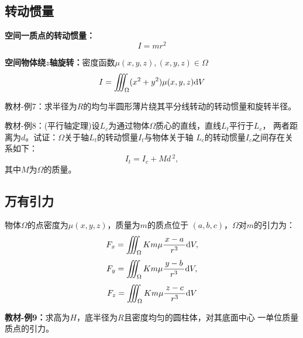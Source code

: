 \subsection{转动惯量}

{\bf 空间一质点的转动惯量：}$${I=mr^2}$$

\begin{center}
\end{center}

{\bf 空间物体绕$z$轴旋转：}密度函数$\mu(x,y,z),(x,y,z)\in\Omega$
$${I=\iiint_{\Omega}(x^2+y^2)\mu(x,y,z)\mathrm{d} V}$$

{教材-例7：}求半径为$R$的均匀半圆形薄片绕其平分线转动的转动惯量和旋转半径。

{教材-例8：}(平行轴定理)设$L_c$为通过物体$\Omega$质心的直线，直线$L_t$平行于$L_c$，
两者距离为$d$。试证：$\Omega$关于轴$L_t$的转动惯量$I_t$与物体关于轴
$L_c$的转动惯量$I_c$之间存在关系如下：
$$I_t=I_c+Md\,^2,$$
其中$M$为$\Omega$的质量。

\subsection{万有引力}

物体$\Omega$的点密度为$\mu(x,y,z)$，质量为$m$的质点位于
$(a,b,c)$，$\Omega$对$m$的引力为：
$${F_x=\iiint_{\Omega}Km\mu\displaystyle\frac{\,{x-a}\,}{\,{r^3}\,}\mathrm{d} V,} $$
$${F_y=\iiint_{\Omega}Km\mu\displaystyle\frac{\,{y-b}\,}{\,{r^3}\,}\mathrm{d} V,} $$
$${F_z=\iiint_{\Omega}Km\mu\displaystyle\frac{\,{z-c}\,}{\,{r^3}\,}\mathrm{d} V} $$

{\bf 教材-例9：}求高为$H$，底半径为$R$且密度均匀的圆柱体，对其底面中心
一单位质量质点的引力。


